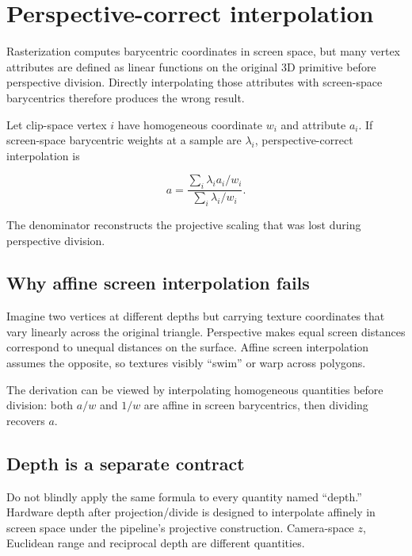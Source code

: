 \hypertarget{appendix-1ed5f96c73ea}{}
\section{Perspective-correct interpolation}\label{appendix-1ed5f96c73ea-perspective-correct-interpolation}

Rasterization computes barycentric coordinates in screen space, but many vertex attributes are defined as linear functions on the original 3D primitive before perspective division. Directly interpolating those attributes with screen-space barycentrics therefore produces the wrong result.

Let clip-space vertex \(i\) have homogeneous coordinate \(w_i\) and attribute \(a_i\). If screen-space barycentric weights at a sample are \(\lambda_i\), perspective-correct interpolation is

\[
a=
\frac{
\sum_i \lambda_i a_i/w_i
}{
\sum_i \lambda_i /w_i
}.
\]

The denominator reconstructs the projective scaling that was lost during perspective division.

\subsection{Why affine screen interpolation fails}\label{appendix-1ed5f96c73ea-why-affine-screen-interpolation-fails}

Imagine two vertices at different depths but carrying texture coordinates that vary linearly across the original triangle. Perspective makes equal screen distances correspond to unequal distances on the surface. Affine screen interpolation assumes the opposite, so textures visibly ``swim'' or warp across polygons.

The derivation can be viewed by interpolating homogeneous quantities before division: both \(a/w\) and \(1/w\) are affine in screen barycentrics, then dividing recovers \(a\).

\subsection{Depth is a separate contract}\label{appendix-1ed5f96c73ea-depth-is-a-separate-contract}

Do not blindly apply the same formula to every quantity named ``depth.'' Hardware depth after projection/divide is designed to interpolate affinely in screen space under the pipeline's projective construction. Camera-space \(z\), Euclidean range and reciprocal depth are different quantities.

